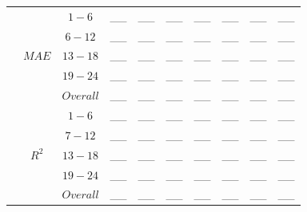 \begin{table}[h]
\begin{center}
\begin{tabular}{@{}p{5.3em}ccccccccc@{}}
                                              & \multirow{5}{*}{$MAE$} & $1 - 6$ & \_\_ & \_\_ & \_\_ & \_\_ & \_\_ & \_\_ & \_\_ \\
                                              &                   & $6 - 12$ & \_\_ & \_\_ & \_\_ & \_\_ & \_\_ & \_\_ & \_\_ \\
                                              &                   & $13 - 18$ & \_\_ & \_\_ & \_\_ & \_\_ & \_\_ & \_\_ & \_\_ \\
                                              &                   & $19 - 24$ & \_\_ & \_\_ & \_\_ & \_\_ & \_\_ & \_\_ & \_\_ \\
                                              &                   & $Overall$ & \_\_ & \_\_ & \_\_ & \_\_ & \_\_ & \_\_ & \_\_ \\ \cmidrule(lr){2-10}
                                              & \multirow{5}{*}{$R^2$} & $1 - 6$ & \_\_ & \_\_ & \_\_ & \_\_ & \_\_ & \_\_ & \_\_ \\
                                              &                   & $7 - 12$ & \_\_ & \_\_ & \_\_ & \_\_ & \_\_ & \_\_ & \_\_ \\
                                              &                   & $13 - 18$ & \_\_ & \_\_ & \_\_ & \_\_ & \_\_ & \_\_ & \_\_ \\
                                              &                   & $19 - 24$ & \_\_ & \_\_ & \_\_ & \_\_ & \_\_ & \_\_ & \_\_ \\
                                              &                   & $Overall$ & \_\_ & \_\_ & \_\_ & \_\_ & \_\_ & \_\_ & \_\_ \\ 
    \bottomrule
    \end{tabular}
\end{center}
\end{table}


